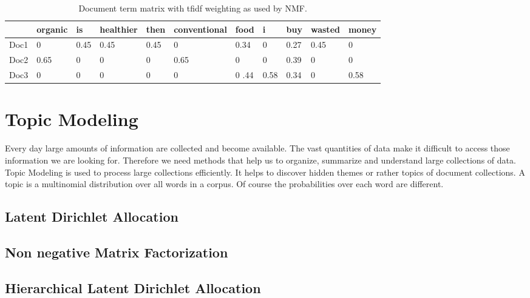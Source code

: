 \begin{table}[h]
	\footnotesize
	\begin{tabular}{lllllllllll}
		\toprule
		& organic & is & healthier & then & conventional & food & i &buy& wasted  & money \\ \midrule
	Doc1 & 0 	& 0.45  &   0.45      &  0.45   &  	0		 & 0.34  	& 0 &0.27  &  0.45   	&  0  \\
	Doc2 & 0.65 	& 0  &      0      &  0   & 0.65			 & 0  	& 0 &0.39  &  0   	&  0  \\
	Doc3 & 0 	& 0  &      0      &  0   & 0 			 & 0 .44 	& 0.58 &0.34  &  0    &  0.58   \\ \bottomrule
	\end{tabular}
	\caption[Sample \ac{tfidf} matrix]{Document term matrix with \ac{tfidf} weighting as used by \ac{NMF}.}
	\label{tab:doc_term_nmf}
\end{table}


\section{Topic Modeling}
\label{sec:topicmodel}
Every day large amounts of information are collected and become available. The vast quantities of data make it difficult to access those information we are looking for. Therefore we need methods that help us to organize, summarize and understand large collections of data.\\
Topic Modeling is used to process large collections efficiently. It helps to discover hidden themes or rather topics of document collections. A topic is a multinomial distribution over all words in a corpus. Of course the probabilities over each word are different. 



\subsection{Latent Dirichlet Allocation}




\subsection{Non negative Matrix Factorization}




\subsection{Hierarchical Latent Dirichlet Allocation}

\newpage
